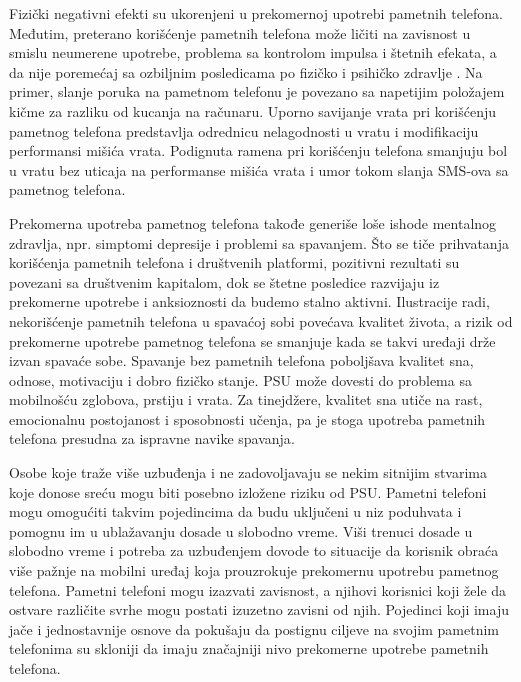 \documentclass[a4paper]{article}
\begin{document}
Fizički negativni efekti su ukorenjeni u prekomernoj upotrebi
pametnih telefona\cite{consume}. Međutim, preterano korišćenje pametnih telefona
može ličiti na zavisnost u smislu neumerene upotrebe,
problema sa kontrolom impulsa i štetnih efekata,
a da nije poremećaj sa ozbiljnim posledicama po fizičko
i psihičko zdravlje \cite{addiction}. Na primer, slanje poruka na
pametnom telefonu je povezano sa napetijim
položajem kičme za razliku od kucanja na računaru.
Uporno savijanje vrata pri korišćenju pametnog telefona predstavlja odrednicu
nelagodnosti u vratu i modifikaciju performansi mišića vrata.
Podignuta ramena pri korišćenju telefona smanjuju bol u vratu bez uticaja na performanse
mišića vrata i umor tokom slanja SMS-ova sa pametnog telefona\cite{addiction}.


Prekomerna upotreba pametnog telefona takođe generiše loše ishode mentalnog
zdravlja, npr. simptomi depresije i problemi sa spavanjem.
Što se tiče prihvatanja korišćenja pametnih telefona i društvenih platformi,
pozitivni rezultati su povezani sa društvenim kapitalom\cite{consume},
dok se štetne posledice razvijaju iz prekomerne upotrebe 
i anksioznosti da budemo stalno aktivni.
Ilustracije radi, nekorišćenje pametnih telefona u spavaćoj sobi
povećava kvalitet života, a rizik od prekomerne upotrebe pametnog
telefona se smanjuje kada se takvi uređaji drže izvan spavaće sobe.
Spavanje bez pametnih telefona poboljšava kvalitet sna, odnose, motivaciju
i dobro fizičko stanje.
PSU može dovesti do problema sa mobilnošću zglobova, prstiju i vrata.
Za tinejdžere, kvalitet sna utiče na rast,
emocionalnu postojanost i sposobnosti učenja, pa je stoga upotreba
pametnih telefona presudna za ispravne navike spavanja\cite{consume}.


Osobe koje traže više uzbuđenja i ne zadovoljavaju se nekim sitnijim stvarima 
koje donose sreću mogu biti posebno izložene riziku od PSU.
Pametni telefoni mogu omogućiti takvim pojedincima da budu uključeni u niz poduhvata
i pomognu im u ublažavanju dosade u slobodno vreme.
Viši trenuci dosade u slobodno vreme i potreba za uzbuđenjem\cite{ethics}
dovode to situacije da korisnik obraća više pažnje na mobilni uređaj koja prouzrokuje prekomernu upotrebu pametnog telefona.
Pametni telefoni mogu izazvati zavisnost,
a njihovi korisnici koji žele da ostvare različite svrhe mogu postati
izuzetno zavisni od njih.
Pojedinci koji imaju jače i jednostavnije osnove da pokušaju da postignu ciljeve
na svojim pametnim telefonima su skloniji da imaju značajniji
nivo prekomerne upotrebe pametnih telefona\cite{factors}.
\end{document}
